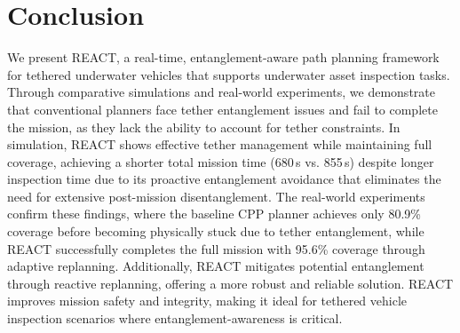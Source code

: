 
\section{Conclusion}
\label{sec:conclusion}


We present \ac{REACT}, a real-time, entanglement-aware path planning framework for tethered underwater vehicles that supports underwater asset inspection tasks. Through comparative simulations and real-world experiments, we demonstrate that conventional planners face tether entanglement issues and fail to complete the mission, as they lack the ability to account for tether constraints. In simulation, \ac{REACT} shows effective tether management while maintaining full coverage, achieving a shorter total mission time (680 s vs. 855 s) despite longer inspection time due to its proactive entanglement avoidance that eliminates the need for extensive post-mission disentanglement. The real-world experiments confirm these findings, where the baseline \ac{CPP} planner achieves only 80.9\% coverage before becoming physically stuck due to tether entanglement, while \ac{REACT} successfully completes the full mission with 95.6\% coverage through adaptive replanning. Additionally, \ac{REACT} mitigates potential entanglement through reactive replanning, offering a more robust and reliable solution. \ac{REACT} improves mission safety and integrity, making it ideal for tethered vehicle inspection scenarios where entanglement-awareness is critical.








